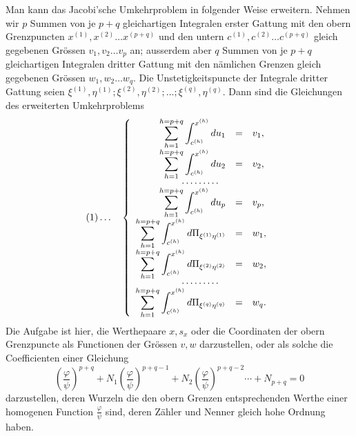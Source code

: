 \documentclass[10pt]{article}
\begin{document}
Man kann das Jacobi'sche Umkehrproblem in folgender Weise erweitern. Nehmen wir \(p\) Summen von je \(p+q\) gleichartigen Integralen erster Gattung mit den obern Grenzpuncten \(x^{(1)},x^{(2)}\ldots x^{(p+q)}\) und den untern \(c^{(1)},c^{(2)}\ldots c^{(p+q)}\) gleich gegebenen Grössen \(v_1,v_2\ldots v_p\) an; ausserdem aber \(q\) Summen von je \(p+q\) gleichartigen Integralen dritter Gattung mit den nämlichen Grenzen gleich gegebenen Grössen \(w_1,w_2\ldots w_q\). Die Unstetigkeitspuncte der Integrale dritter Gattung seien \(\xi^{(1)},\eta^{(1)};\xi^{(2)},\eta^{(2)};\ldots;\xi^{(q)},\eta^{(q)}\). Dann sind die Gleichungen des erweiterten Umkehrproblems
\[
(1)\ldots\quad
\left\{\begin{array}{rcl}
\displaystyle\sum_{h=1}^{h=p+q}\int_{c^{(h)}}^{x^{(h)}}du_1&=&v_1,\\
\displaystyle\sum_{h=1}^{h=p+q}\int_{c^{(h)}}^{x^{(h)}}du_2&=&v_2,\\[-0.2em]
\multicolumn{3}{c}{\cdots\cdots\cdots}\\[-0.2em]
\displaystyle\sum_{h=1}^{h=p+q}\int_{c^{(h)}}^{x^{(h)}}du_p&=&v_p,\\
\displaystyle\sum_{h=1}^{h=p+q}\int_{c^{(h)}}^{x^{(h)}}d\Pi_{\xi^{(1)}\eta^{(1)}}&=&w_1,\\
\displaystyle\sum_{h=1}^{h=p+q}\int_{c^{(h)}}^{x^{(h)}}d\Pi_{\xi^{(2)}\eta^{(2)}}&=&w_2,\\[-0.2em]
\multicolumn{3}{c}{\cdots\cdots\cdots}\\[-0.2em]
\displaystyle\sum_{h=1}^{h=p+q}\int_{c^{(h)}}^{x^{(h)}}d\Pi_{\xi^{(q)}\eta^{(q)}}&=&w_q.
\end{array}\right.
\]
Die Aufgabe ist hier, die Werthepaare \(x,s_x\) oder die Coordinaten der obern Grenzpuncte als Functionen der Grössen \(v,w\) darzustellen, oder als solche die Coefficienten einer Gleichung
\[
\left(\frac{\varphi}{\psi}\right)^{p+q}+N_1\left(\frac{\varphi}{\psi}\right)^{p+q-1}+N_2\left(\frac{\varphi}{\psi}\right)^{p+q-2}\cdots+N_{p+q}=0
\]
darzustellen, deren Wurzeln die den obern Grenzen entsprechenden Werthe einer homogenen Function \(\frac{\varphi}{\psi}\) sind, deren Zähler und Nenner gleich hohe Ordnung haben.
\end{document}
